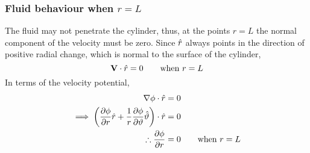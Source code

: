 \subsubsection{Fluid behaviour when $r=L$}
The fluid may not penetrate the cylinder, thus, at the points $r=L$ the normal component of the velocity must be zero. Since $\hat{r}$ always points in the direction of positive radial change, which is normal to the surface of the cylinder,
$$
    \mathbf{V}\cdot\hat{r}=0\qquad\text{when $r=L$}
$$
In terms of the velocity potential,
\begin{align*}
    \nabla\phi\cdot\hat{r}&=0\\
    \implies\left(\pdv{\phi}{r}\hat{r}+\frac{1}{r}\pdv{\phi}{\vartheta}\hat{\vartheta}\right)\cdot\hat{r}&=0\\
    \therefore\pdv{\phi}{r}&=0\qquad\text{when $r=L$}
\end{align*}